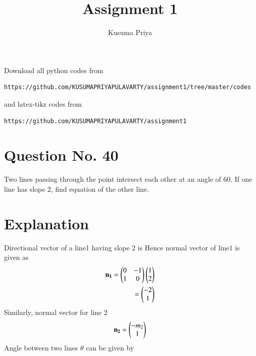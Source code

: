 \documentclass[journal,12pt,twocolumn]{IEEEtran}
\begin{document}
\renewcommand{\thefigure}{\theproblem}

\def\putbox#1#2#3{\makebox[0in][l]{\makebox[#1][l]{}\raisebox{\baselineskip}[0in][0in]{\raisebox{#2}[0in][0in]{#3}}}}
     \def\rightbox#1{\makebox[0in][r]{#1}}
     \def\centbox#1{\makebox[0in]{#1}}
     \def\topbox#1{\raisebox{-\baselineskip}[0in][0in]{#1}}
     \def\midbox#1{\raisebox{-0.5\baselineskip}[0in][0in]{#1}}
\vspace{3cm}
\title{Assignment 1}
\author{Kusuma Priya}

\maketitle
\newpage

\bigskip
\renewcommand{\thefigure}{\theenumi}
\renewcommand{\thetable}{\theenumi}
Download all python codes from 
\begin{lstlisting}
https://github.com/KUSUMAPRIYAPULAVARTY/assignment1/tree/master/codes
\end{lstlisting}
%
and latex-tikz codes from 
%
\begin{lstlisting}
https://github.com/KUSUMAPRIYAPULAVARTY/assignment1
\end{lstlisting}
%
 
 \section{Question No. 40}
Two lines passing through the point  intersect each other at an angle of 60\degree. If one line has slope 2, find equation of the other line. 
%

\section{Explanation}
Directional vector of a line1 having slope 2 is 
    Hence normal vector of line$1$ is given as
\begin{align}
\mathbf{n_1} =\begin{pmatrix}0 & -1\\1 & 0\end{pmatrix}\begin{pmatrix}1\\2\end{pmatrix}\\=\begin{pmatrix}-2\\1\end{pmatrix}
\end{align}
Similarly, normal vector for line 2 \\
\begin{align}
\mathbf{n_2} = \begin{pmatrix}-m_2\\1\end{pmatrix}
\end{align}
Angle between two lines $\theta$ can be given by
\end{document}

